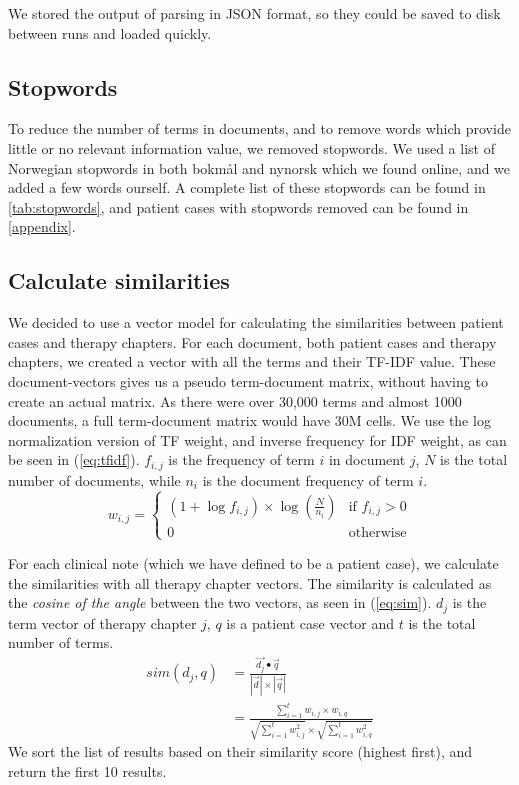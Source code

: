 \documentclass[a4paper, 11pt]{article}
\begin{document}
We stored the output of parsing in JSON format, so they could be saved to disk
between runs and loaded quickly.

\subsection{Stopwords}
To reduce the number of terms in documents, and to remove words which provide
little or no relevant information value, we removed stopwords.
We used a list of Norwegian stopwords in both bokmål and nynorsk which we
found online, and we added a few words ourself. A complete list of these stopwords can
be found in \autoref{tab:stopwords}, and patient cases with stopwords removed
can be found in \autoref{appendix}.

\subsection{Calculate similarities}
We decided to use a vector model for calculating the similarities between
patient cases and therapy chapters. For each document, both patient cases
and therapy chapters, we created a vector with all the terms and their
TF-IDF value. These document-vectors gives us a pseudo term-document matrix,
without having to create an actual matrix. As there were over 30,000 terms
and almost 1000 documents, a full term-document matrix would have 30M cells.
We use the log normalization version of TF weight, and inverse frequency for
IDF weight, as can be seen in (\ref{eq:tfidf}). \( f_{i,j} \) is the frequency
of term \( i \) in document \( j \), \( N \) is the total number of documents,
while \( n_{i} \) is the document frequency of term \( i \).
\begin{equation} \label{eq:tfidf}
	w_{i,j} =
	\begin{cases}
		(1 + \log f_{i,j}) \times \log(\frac{N}{n_{i}}) & \text{if } f_{i,j} > 0 \\
		0												& \text{otherwise}
	\end{cases}
\end{equation}

For each clinical note (which we have defined to be a patient case), we
calculate the similarities with all therapy chapter vectors. The similarity is
calculated as the \emph{cosine of the angle} between the two vectors, as seen
in (\ref{eq:sim}). \( d_{j} \) is the term vector of therapy chapter \( j \),
\( q \) is a patient case vector and \( t \) is the total number of terms.
\begin{align} \label{eq:sim}
	sim(d_{j}, q) &= \frac{\vec{d_{j}} \bullet \vec{q}}{|\vec{d}| \times |\vec{q}|} \nonumber \\
				  &= \frac{\sum_{i=1}^{t} w_{i,j} \times w_{i,q}}{\sqrt{\sum_{i=1}^{t} w_{i,j}^2} \times \sqrt{\sum_{i=1}^{t} w_{i,q}^2}}
\end{align}
We sort the list of results based on their similarity score (highest first),
and return the first 10 results.
\end{document}
